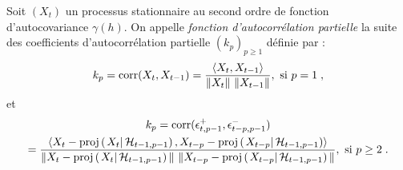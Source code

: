 %
\begin{definition}
 \label{def:corrpar}
 Soit $(X_t)$ un processus stationnaire au second ordre de fonction d'autocovariance
$\gamma(h)$. On appelle \emph{fonction d'autocorr\'elation partielle} la
suite des coefficients d'autocorr\'elation partielle  $(k_p)_{p \geq 1}$
d\'efinie par :
\begin{equation}
 \label{eq:defcorrpart}
 k_p = \mathrm{corr}(X_t,X_{t-1})= \frac{\left\langle X_t, X_{t-1} \right\rangle}{\|X_t\| \,\,
   \|X_{t-1}\|},\textrm{ si } p=1\;,
\end{equation}
et
\begin{multline}
k_p=\corr(\epsilon_{t,p-1}^+,\epsilon_{t-p,p-1}^-)\\
           = \dfrac{\pscal{X_{t}-\proj{X_t}{\cH_{t-1,p-1}}}{X_{t-p}-\proj{X_{t-p}}{\cH_{t-1,p-1}}}}
            {\|X_{t}-\proj{X_t}{\cH_{t-1,p-1}}\| \,\,
              \|X_{t-p}-\proj{X_{t-p}}{\cH_{t-1,p-1}}\|},
\textrm{ si } p\geq 2\;.
\end{multline}
\end{definition}

